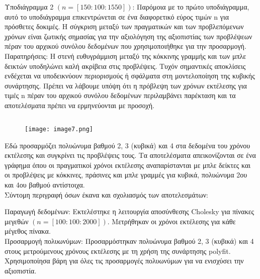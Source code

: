 \documentclass[12pt,a4paper]{article}
\begin{document}
Υποδιάγραμμα 2  $(n=[150:100:1550])$: 
Παρόμοια με το πρώτο υποδιάγραμμα, αυτό το υποδιάγραμμα επικεντρώνεται σε ένα διαφορετικό εύρος τιμών n για πρόσθετες δοκιμές. Η σύγκριση μεταξύ των πραγματικών και των προβλεπόμενων χρόνων είναι ζωτικής σημασίας για την αξιολόγηση της αξιοπιστίας των προβλέψεων πέραν του αρχικού συνόλου δεδομένων που χρησιμοποιήθηκε για την προσαρμογή.\\

Παρατηρήσεις:
Η στενή ευθυγράμμιση μεταξύ της κόκκινης γραμμής και των μπλε δεικτών υποδηλώνει καλή ακρίβεια στις προβλέψεις. Τυχόν σημαντικές αποκλίσεις ενδέχεται να υποδεικνύουν περιορισμούς ή σφάλματα στη μοντελοποίηση της κυβικής συνάρτησης. Πρέπει να λάβουμε υπόψη ότι η πρόβλεψη των χρόνων εκτέλεσης για τιμές n πέραν του αρχικού συνόλου δεδομένων περιλαμβάνει παρέκταση και τα αποτελέσματα πρέπει να ερμηνεύονται με προσοχή.

\subsection{}
\begin{figure}[h]
\centering
\texttt{[image: image7.png]} 
\label{fig:image8}
\end{figure}
\FloatBarrier %
Εδώ προσαρμόζει πολυώνυμα βαθμού 2, 3 (κυβικά) και 4 στα δεδομένα του χρόνου εκτέλεσης και συγκρίνει τις προβλέψεις τους. Τα αποτελέσματα απεικονίζονται σε ένα γράφημα όπου οι πραγματικοί χρόνοι εκτέλεσης αναπαρίστανται με μπλε δείκτες και οι προβλέψεις με κόκκινες, πράσινες και μπλε γραμμές για κυβικά, πολυώνυμα 2ου και 4ου βαθμού αντίστοιχα.\\ 

Σύντομη περιγραφή όσων έκανα και σχολιασμός των αποτελεσμάτων:

Παραγωγή δεδομένων: Εκτελέστηκε η λειτουργία αποσύνθεσης Cholesky για πίνακες μεγεθών $(n = [100:100:2000])$. Μετρήθηκαν οι χρόνοι εκτέλεσης για κάθε μέγεθος πίνακα.\\

Προσαρμογή πολυωνύμων: Προσαρμόστηκαν πολυώνυμα βαθμού 2, 3 (κυβικά) και 4 στους μετρούμενους χρόνους εκτέλεσης με τη χρήση της συνάρτησης polyfit. Χρησιμοποίησα βάρη για όλες τις προσαρμογές πολυωνύμων για να ενισχύσει την αξιοπιστία.\\
\end{document}
